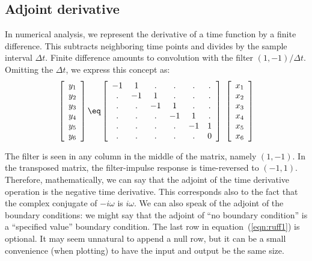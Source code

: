 \subsection{Adjoint derivative}
In numerical analysis,
we represent the derivative of a time function
by a finite difference.
This subtracts neighboring time points and
divides by the sample interval $\Delta t$.
Finite difference amounts to convolution with the filter $(1,-1)/\Delta t$.
Omitting the $\Delta t$, we express this concept as:
\begin{equation}
\left[ \begin{array}{c}
        y_1 \\
        y_2 \\
        y_3 \\
        y_4 \\
        y_5 \\
        y_6
        \end{array} \right]
\eq
\left[ \begin{array}{cccccc}
        -1& 1& .& .& .& . \\
         .&-1& 1& .& .& . \\
         .& .&-1& 1& .& . \\
         .& .& .&-1& 1& . \\
         .& .& .& .&-1& 1 \\
         .& .& .& .& .& 0
        \end{array} \right] \ 
\left[ \begin{array}{c}
        x_1 \\
        x_2 \\
        x_3 \\
        x_4 \\
        x_5 \\
        x_6
        \end{array} \right]
 \label{eqn:ruff1}
\end{equation}
\par
The filter is seen in any
column  in the middle of the matrix,
namely $(1,-1)$. 
In the transposed matrix,
the filter-impulse response
is time-reversed to $(-1,1)$.
Therefore, mathematically,
we can say that the adjoint of the time derivative operation
is the negative time derivative.
This corresponds also to the fact that
the complex conjugate of $-i\omega$ is $i\omega$.
We can also speak of the adjoint of the boundary conditions:
we might say that the adjoint of ``no boundary condition''
is a ``specified value'' boundary condition.
The last row in equation~(\ref{eqn:ruff1}) is optional.
It may seem unnatural to append a null row, but it can be a small
convenience (when plotting) to have the input and output be the same size.
\par

